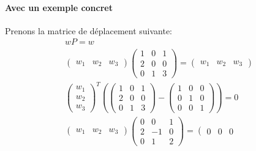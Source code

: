 \documentclass[letterpaper]{article}
\begin{document}
    \paragraph{Avec un exemple concret}
    Prenons la matrice de déplacement suivante:
    \begin{align*} 
      wP = w\\ 
      \left( 
	\begin{array}{ccc}
	w_1 & w_2 & w_3
	\end{array} 
      \right) 
      \left( 
	\begin{array}{ccc}
	1 & 0 & 1 \\
	2 & 0 & 0 \\
	0 & 1 & 3 
	\end{array} 
      \right)
      = 
      \left( 
	\begin{array}{ccc}
	w_1 & w_2 & w_3
	\end{array} 
      \right)  
      \\
      \left( 
	\begin{array}{c}
	w_1\\
	w_2\\
	w_3
	\end{array} 
      \right)^T
      \left(
	\left(
	\begin{array}{ccc}
	1 & 0 & 1 \\
	2 & 0 & 0 \\
	0 & 1 & 3 
	\end{array} 
	\right)
	-
	\left(
	\begin{array}{ccc}
	1 & 0 & 0 \\
	0 & 1 & 0 \\
	0 & 0 & 1 
	\end{array} 
	\right)
      \right)
      = 0
      \\ 
      \left( 
	\begin{array}{ccc}
	w_1 & w_2 & w_3
	\end{array} 
      \right)
      \left( 
	\begin{array}{ccc}
	0 & 0 & 1 \\
	2 & -1 & 0 \\
	0 & 1 & 2 
	\end{array} 
      \right) 
      = 
      \left( 
	\begin{array}{ccc}
	0 & 0 & 0
	\end{array} 

\end{align*}
\end{document}
